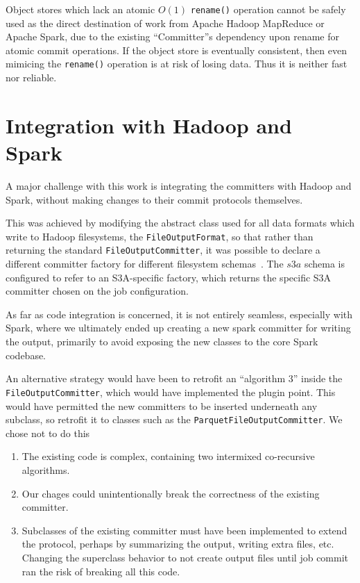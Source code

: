 \documentclass[conference]{IEEEtran}
\begin{document}
Object stores which lack an atomic $O(1)$ \texttt{rename()} operation cannot
be safely used as the direct destination of work from Apache Hadoop MapReduce
or Apache Spark, due to the existing ``Committer''s dependency upon rename for
atomic commit operations.
If the object store is eventually consistent, then even mimicing the \texttt{rename()}
operation is at risk of losing data.
Thus it is neither fast nor reliable.

\section{Integration with Hadoop and Spark}
\label{sec:integration}

A major challenge with this work is integrating the committers with Hadoop
and Spark, without making changes to their commit protocols themselves.

This was achieved by modifying the abstract class used for all data formats
which write to Hadoop filesystems, the \texttt{FileOutputFormat}, so that rather than
returning the standard \texttt{FileOutputCommitter}, it was possible to declare
a different committer factory for different filesystem schemas\ \cite{MAPREDUCE-6823}.
The $s3a$ schema is configured to refer to an S3A-specific factory, which
returns the specific S3A committer chosen on the job configuration.


As far as code integration is concerned, it is not entirely seamless, especially
with Spark, where we ultimately ended up creating a new spark committer for
writing the output, primarily to avoid exposing the new classes to the core
Spark codebase.

An alternative strategy would have been to retrofit an ``algorithm 3'' inside
the \texttt{FileOutputCommitter}, which would have implemented the plugin point.
This would have permitted the new committers to be inserted underneath any
subclass, so retrofit it to classes such as the \texttt{ParquetFileOutputCommitter}.
We chose not to do this

\begin{enumerate}
  \item The existing code is complex, containing two intermixed co-recursive
  algorithms.
  \item Our chages could unintentionally break the correctness of the existing committer.
  \item Subclasses of the existing committer must have been implemented to extend
  the protocol, perhaps by summarizing the output, writing extra files, etc.
  Changing the superclass behavior to not create output files until job commit
  ran the risk of breaking all this code.
\end{enumerate}
\end{document}
